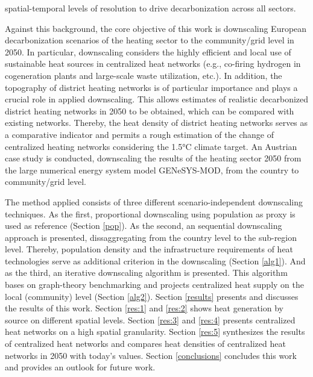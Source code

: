 spatial-temporal levels of resolution to drive decarbonization across all sectors.\vspace{0.3cm}

Against this background, the core objective of this work is downscaling European decarbonization scenarios of the heating sector to the community/grid level in 2050. In particular, downscaling considers the highly efficient and local use of sustainable heat sources in centralized heat networks (e.g., co-firing hydrogen in cogeneration plants and large-scale waste utilization, etc.). In addition, the topography of district heating networks is of particular importance and plays a crucial role in applied downscaling. This allows estimates of realistic decarbonized district heating networks in 2050 to be obtained, which can be compared with existing networks. Thereby, the heat density of district heating networks serves as a comparative indicator and permits a rough estimation of the change of centralized heating networks considering the 1.5°C climate target. An Austrian case study is conducted, downscaling the results of the heating sector 2050 from the large numerical energy system model GENeSYS-MOD, from the country to community/grid level.\vspace{0.3cm}

The method applied consists of three different scenario-independent downscaling techniques. As the first, proportional downscaling using population as proxy is used as reference (Section \ref{pop}). As the second, an sequential downscaling approach is presented, dissaggregating from the country level to the sub-region level. Thereby, population density and the infrastructure requirements of heat technologies serve as additional criterion in the downscaling (Section \ref{alg1}). And as the third, an iterative downscaling algorithm is presented. This algorithm bases on graph-theory benchmarking and projects centralized heat supply on the local (community) level (Section \ref{alg2}). Section \ref{results} presents and discusses the results of this work. Section \ref{res:1} and \ref{res:2} shows heat generation by source on different spatial levels. Section \ref{res:3} and \ref{res:4} presents centralized heat networks on a high spatial granularity. Section \ref{res:5} synthesizes the results of centralized heat networks and compares heat densities of centralized heat networks in 2050 with today's values. Section \ref{conclusions} concludes this work and provides an outlook for future work. 